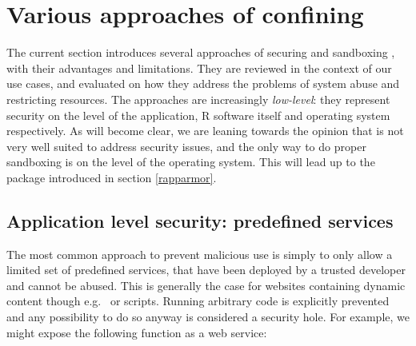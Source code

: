\section{Various approaches of confining \R}

The current section introduces several approaches of securing and sandboxing \R,
with their advantages and limitations. They are reviewed in the context of our
use cases, and evaluated on how they address the problems of system abuse and
restricting resources. The approaches are increasingly \emph{low-level}: they
represent security on the level of the application, R software itself and
operating system respectively. As will become clear, we are leaning towards the
opinion that \R is not very well suited to address security issues, and the only
way to do proper sandboxing is on the level of the operating system. This will
lead up to the \RAppArmor package introduced in section \ref{rapparmor}.


\subsection{Application level security: predefined services}

The most common approach to prevent malicious use is simply to only allow a
limited set of predefined services, that have been deployed by a trusted
developer and cannot be abused. This is generally the case for websites
containing dynamic content though e.g.\  or 
scripts.
Running arbitrary code is explicitly prevented and any possibility to do so
anyway is considered a security hole. For example, we might expose the following
function as a web service:

\begin{knitrout}\mycodesize
{}\color{fgcolor}\begin{kframe}
\begin{alltt}
 \hlkwb{<-}  \hlstd{(}\hlstd{) \{}
   \hlkwb{<-} \hlstd{(}\hlstd{,}
     \hlstd{,}
     \hlstd{=} \hlstd{)}
   \hlkwb{<-} 
  \hlopt{$} \hlkwb{<-} \hlopt{$}
   \hlkwb{<-}     \hlstd{=} \hlstd{(}\hlstd{,}
    \hlstd{),}  
\hlstd{\}}
\end{alltt}
\end{kframe}
\end{knitrout}


